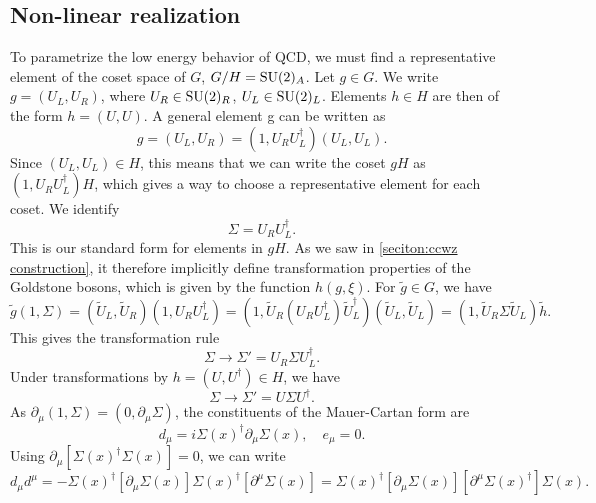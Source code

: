 \subsection*{Non-linear realization}

To parametrize the low energy behavior of QCD, we must find a representative element of the coset space of $G$, $G/H = \mathrm{SU}(2)_A$.
Let $g\in G$. 
We write $g = (U_L, U_R)$, where $U_R \in \mathrm{SU}(2)_R$, $U_L \in \mathrm{SU}(2)_L$.
Elements $h \in H$ are then of the form $h = (U, U)$.
A general element g can be written as
\begin{equation}
    g = (U_L, U_R) = (1, U_R U_L^\dagger) (U_L, U_L).
\end{equation}
Since $(U_L, U_L) \in H$, this means that we can write the coset $g H$ as $(1, U_R U_L^\dagger)H$, which gives a way to choose a representative element for each coset.
We identify
\begin{equation}
    \Sigma = U_R U_L^\dagger. 
\end{equation}
This is our standard form for elements in $gH$.
As we saw in \autoref{seciton:ccwz construction}, it therefore implicitly define transformation properties of the Goldstone bosons, which is given by the function $h(g, \xi)$.
For $\tilde g \in G$, we have 
\begin{equation}
    \tilde g (1, \Sigma)
    = (\tilde U_L, \tilde U_R) (1, U_R U_L^\dagger)
    = (1, \tilde U_R (U_R U_L^\dagger) \tilde U_L^\dagger) (\tilde U_L, \tilde U_L)
    = (1, \tilde U_R \Sigma \tilde U_L) \tilde h.
\end{equation}
This gives the transformation rule
\begin{equation}
    \Sigma \rightarrow \Sigma' = U_R \Sigma U_L^\dagger.
\end{equation}
Under transformations by $h = (U, U^\dagger) \in H$, we have
\begin{equation}
    \label{sigma transform under H}
    \Sigma \rightarrow \Sigma' = U \Sigma U^\dagger.
\end{equation}
As $\partial_\mu  (1, \Sigma) = (0, \partial_\mu \Sigma)$, the constituents of the Mauer-Cartan form are
\begin{equation}
    d_\mu = i \Sigma(x)^\dagger \partial_\mu \Sigma(x),\quad
    e_\mu = 0.
\end{equation}
Using $\partial_\mu [\Sigma(x)^\dagger\Sigma(x)] = 0 $, we can write
\begin{equation}
    d_\mu d^\mu = 
    - \Sigma(x)^\dagger [\partial_\mu \Sigma(x)] \Sigma(x)^\dagger [\partial^\mu \Sigma(x)]
    =\Sigma(x)^\dagger [\partial_\mu \Sigma(x)] [\partial^\mu \Sigma(x)^\dagger] \Sigma(x).
\end{equation}
